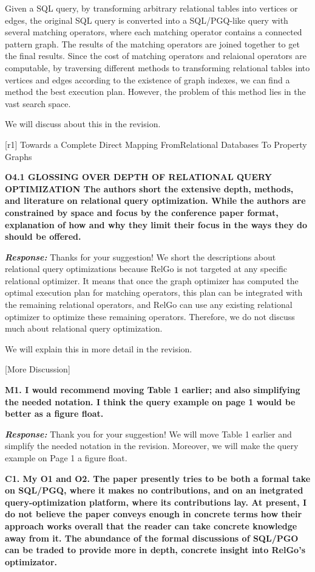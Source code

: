Given a SQL query, by transforming arbitrary relational tables into vertices or edges, the original SQL query is converted into a SQL/PGQ-like query with several matching operators, where each matching operator contains a connected pattern graph.
The results of the matching operators are joined together to get the final results.
Since the cost of matching operators and relaional operators are computable, by traversing different methods to transforming relational tables into vertices and edges according to the existence of graph indexes, we can find a method the best execution plan.
However, the problem of this method lies in the vast search space.

We will discuss about this in the revision.

[r1] Towards a Complete Direct Mapping FromRelational Databases To Property Graphs

\textbf{O4.1 GLOSSING OVER DEPTH OF RELATIONAL QUERY OPTIMIZATION
The authors short the extensive depth, methods, and literature on relational query optimization. While the authors are constrained by space and focus by the conference paper format, explanation of how and why they limit their focus in the ways they do should be offered. }

\textbf{\textit{Response: }}
Thanks for your suggestion! 
We short the descriptions about relational query optimizations because RelGo is not targeted at any specific relational optimizer.
It means that once the graph optimizer has computed the optimal execution plan for matching operators, this plan can be integrated with the remaining relational operators, and RelGo can use any existing relational optimizer to optimize these remaining operators.
Therefore, we do not discuss much about relational query optimization.

We will explain this in more detail in the revision.

[More Discussion]


\textbf{M1. I would recommend moving Table 1 earlier; and also simplifying the needed notation. I think the query example on page 1 would be better as a figure float. }

\textbf{\textit{Response: }}
Thank you for your suggestion! We will move Table 1 earlier and simplify the needed notation in the revision. Moreover, we will make the query example on Page 1 a figure float.

\textbf{
C1. My O1 and O2. The paper presently tries to be both a formal take on SQL/PGQ, where it makes no contributions, and on an inetgrated query-optimization platform, where its contributions lay. At present, I do not believe the paper conveys enough in concrete terms how their approach works overall that the reader can take concrete knowledge away from it. The abundance of the formal discussions of SQL/PGO can be traded to provide more in depth, concrete insight into RelGo's optimizator.}

